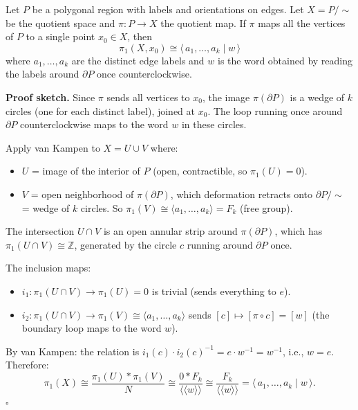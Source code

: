 \documentclass[11pt]{report}
\renewenvironment{proof}[1][Proof]{\noindent\textbf{#1.} }{\hfill$\square$\par\vspace{5pt}}
\begin{document}
\begin{thmbox}
Let $P$ be a polygonal region with labels and orientations on edges. Let $X = P/{\sim}$ be the quotient space and $\pi: P \to X$ the quotient map. If $\pi$ maps all the vertices of $P$ to a single point $x_0 \in X$, then
\[\pi_1(X, x_0) \cong \langle\, a_1, \ldots, a_k \mid w \,\rangle\]
where $a_1, \ldots, a_k$ are the distinct edge labels and $w$ is the word obtained by reading the labels around $\partial P$ once counterclockwise.
\end{thmbox}

\begin{proof}[Proof sketch]
Since $\pi$ sends all vertices to $x_0$, the image $\pi(\partial P)$ is a wedge of $k$ circles (one for each distinct label), joined at $x_0$. The loop running once around $\partial P$ counterclockwise maps to the word $w$ in these circles.

Apply van Kampen to $X = U \cup V$ where:
\begin{itemize}[nosep]
    \item $U$ = image of the interior of $P$ (open, contractible, so $\pi_1(U) = 0$).
    \item $V$ = open neighborhood of $\pi(\partial P)$, which deformation retracts onto $\partial P / {\sim}$ = wedge of $k$ circles. So $\pi_1(V) \cong \langle a_1, \ldots, a_k \rangle = F_k$ (free group).
\end{itemize}
The intersection $U \cap V$ is an open annular strip around $\pi(\partial P)$, which has $\pi_1(U \cap V) \cong \mathbb{Z}$, generated by the circle $c$ running around $\partial P$ once.

The inclusion maps:
\begin{itemize}[nosep]
    \item $i_1: \pi_1(U \cap V) \to \pi_1(U) = 0$ is trivial (sends everything to $e$).
    \item $i_2: \pi_1(U \cap V) \to \pi_1(V) \cong \langle a_1, \ldots, a_k \rangle$ sends $[c] \mapsto [\pi \circ c] = [w]$ (the boundary loop maps to the word $w$).
\end{itemize}
By van Kampen: the relation is $i_1(c) \cdot i_2(c)^{-1} = e \cdot w^{-1} = w^{-1}$, i.e., $w = e$. Therefore:
\[\pi_1(X) \cong \frac{\pi_1(U) * \pi_1(V)}{N} \cong \frac{0 * F_k}{\langle\!\langle w \rangle\!\rangle} \cong \frac{F_k}{\langle\!\langle w \rangle\!\rangle} = \langle\, a_1, \ldots, a_k \mid w \,\rangle.\]
\end{proof}
\end{document}
